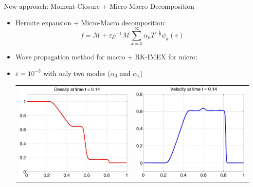 \documentclass[final,hyperref={pdfpagelabels=false}]{beamer}
\newcommand{\bunderline}[1]{\underline{#1}}
\renewcommand{\vec}[1]{{\bunderline{#1}}}
\newcommand{\mat}[1]{{\bunderline{\bunderline{#1}}}}
\newcommand{\inred}[1]
        {\mbox{\color{red} #1}}
\newcommand{\inblu}[1]
        {\mbox{\color{blue} #1}}
\newcommand{\M}{\mathcal M}
\begin{document}
\begin{frame}[t]
\begin{columns}[t]
\begin{column}{.31\textwidth}
\begin{block}{New approach: Moment-Closure + Micro-Macro Decomposition}
\begin{itemize}
\item Hermite expansion + Micro-Macro decomposition:
\begin{equation*}
     f = \M + \varepsilon \rho^{-1} \M
     \sum_{k=3}^{\infty} \alpha_k T^{-\frac{k}{2}} \psi_k\left( v \right)
\end{equation*}
\item Wave propagation method for macro + RK-IMEX for micro:
\item {$\varepsilon=10^{-3}$ with only two modes ($\alpha_3$ and $\alpha_4$)}
\begin{center}
\begin{tabular}{cc}
\includegraphics[width=110mm]{hbgk_density_1em3.jpg}  &
\includegraphics[width=110mm]{hbgk_velocity_1em3.jpg} \\

\end{tabular}
\end{center}
\end{itemize}
\end{block}
\end{column}
\end{columns}
\end{frame}
\end{document}
